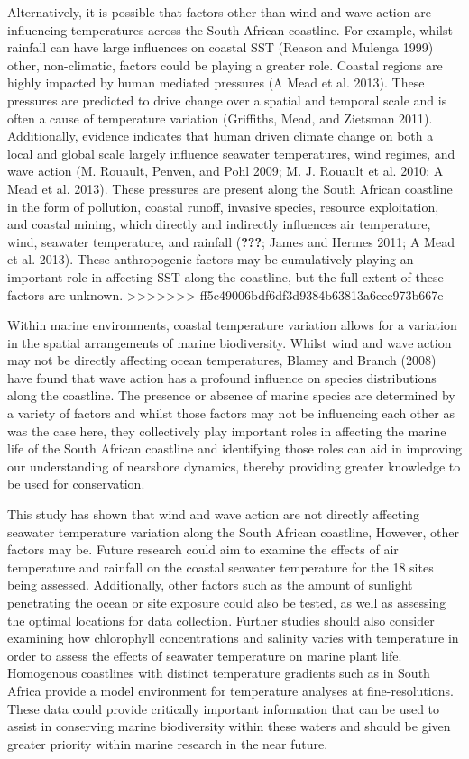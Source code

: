 \documentclass[12pt,A4paper,]{article}
\begin{document}
Alternatively, it is possible that factors other than wind and wave
action are influencing temperatures across the South African coastline.
For example, whilst rainfall can have large influences on coastal SST
(Reason and Mulenga 1999) other, non-climatic, factors could be playing
a greater role. Coastal regions are highly impacted by human mediated
pressures (A Mead et al. 2013). These pressures are predicted to drive
change over a spatial and temporal scale and is often a cause of
temperature variation (Griffiths, Mead, and Zietsman 2011).
Additionally, evidence indicates that human driven climate change on
both a local and global scale largely influence seawater temperatures,
wind regimes, and wave action (M. Rouault, Penven, and Pohl 2009; M. J.
Rouault et al. 2010; A Mead et al. 2013). These pressures are present
along the South African coastline in the form of pollution, coastal
runoff, invasive species, resource exploitation, and coastal mining,
which directly and indirectly influences air temperature, wind, seawater
temperature, and rainfall ({\textbf{???}}; James and Hermes 2011; A Mead
et al. 2013). These anthropogenic factors may be cumulatively playing an
important role in affecting SST along the coastline, but the full extent
of these factors are unknown.
>>>>>>> ff5c49006bdf6df3d9384b63813a6eee973b667e

Within marine environments, coastal temperature variation allows for a
variation in the spatial arrangements of marine biodiversity. Whilst
wind and wave action may not be directly affecting ocean temperatures,
Blamey and Branch (2008) have found that wave action has a profound
influence on species distributions along the coastline. The presence or
absence of marine species are determined by a variety of factors and
whilst those factors may not be influencing each other as was the case
here, they collectively play important roles in affecting the marine
life of the South African coastline and identifying those roles can aid
in improving our understanding of nearshore dynamics, thereby providing
greater knowledge to be used for conservation.

This study has shown that wind and wave action are not directly
affecting seawater temperature variation along the South African
coastline, However, other factors may be. Future research could aim to
examine the effects of air temperature and rainfall on the coastal
seawater temperature for the 18 sites being assessed. Additionally,
other factors such as the amount of sunlight penetrating the ocean or
site exposure could also be tested, as well as assessing the optimal
locations for data collection. Further studies should also consider
examining how chlorophyll concentrations and salinity varies with
temperature in order to assess the effects of seawater temperature on
marine plant life. Homogenous coastlines with distinct temperature
gradients such as in South Africa provide a model environment for
temperature analyses at fine-resolutions. These data could provide
critically important information that can be used to assist in
conserving marine biodiversity within these waters and should be given
greater priority within marine research in the near future.
\end{document}
